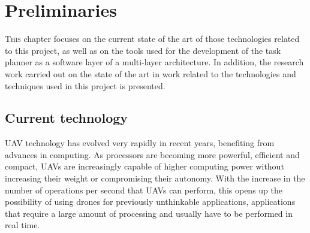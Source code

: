 \chapter{Preliminaries}
\label{ch:Preliminaries}
\lettrine[lraise=-0.1, lines=2, loversize=0.2]{T}{his} chapter focuses on the current state of the art of those technologies related to this project, as well as on the tools used for the development of the task planner as a software layer of a multi-layer architecture. In addition, the research work carried out on the state of the art in work related to the technologies and techniques used in this project is presented. 

\section{Current technology}
\label{sec:CurrentTechnology}
\gls{UAV} technology has evolved very rapidly in recent years, benefiting from advances in computing. As processors are becoming more powerful, efficient and compact, \glspl{UAV} are increasingly capable of higher computing power without increasing their weight or compromising their autonomy. With the increase in the number of operations per second that \glspl{UAV} can perform, this opens up the possibility of using drones for previously unthinkable applications, applications that require a large amount of processing and usually have to be performed in real time.


